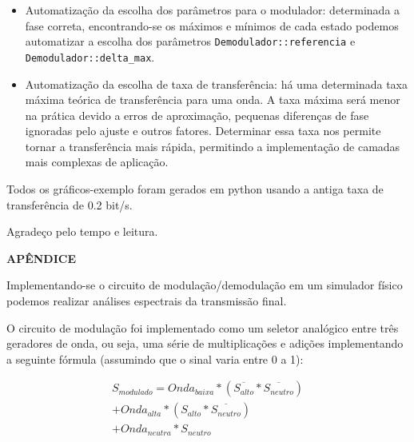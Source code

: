 \documentclass[titlepage,twocolumn]{article}
\begin{document}
\begin{itemize}
    \item Automatização da escolha dos parâmetros para o modulador: determinada a fase correta, encontrando-se os máximos e mínimos de cada estado podemos automatizar a escolha dos parâmetros \texttt{Demodulador::referencia} e \texttt{Demodulador::delta\_max}.
    \item Automatização da escolha de taxa de transferência: há uma determinada taxa máxima teórica de transferência para uma onda. A taxa máxima será menor na prática devido a erros de aproximação, pequenas diferenças de fase ignoradas pelo ajuste e outros fatores. Determinar essa taxa nos permite tornar a transferência mais rápida, permitindo a implementação de camadas mais complexas de aplicação.
\end{itemize}

\begin{center}
    \small{
        Todos os gráficos-exemplo foram gerados em python usando a antiga taxa de transferência de 0.2 bit/s.
    }
\end{center}

\begin{center}
\end{center}

\begin{center}
    \footnotesize{Agradeço pelo tempo e leitura.}
\end{center}

\newpage

\huge
\begin{center}
    \textbf{APÊNDICE}
\end{center}
\normalsize

Implementando-se o circuito de modulação/demodulação em um simulador físico podemos realizar análises espectrais da transmissão final.

O circuito de modulação foi implementado como um seletor analógico entre três geradores de onda, ou seja, uma série de multiplicações e adições implementando a seguinte fórmula (assumindo que o sinal varia entre 0 a 1):

\begin{equation}
    \begin{split}
        S_{modulado} = Onda_{baixa}*(\overline{S_{alto}}*\overline{S_{neutro}})\\
        +Onda_{alta}*(S_{alto}*\overline{S_{neutro}})\\
        +Onda_{neutra}*S_{neutro}
    \end{split}
\end{equation}
\end{document}
